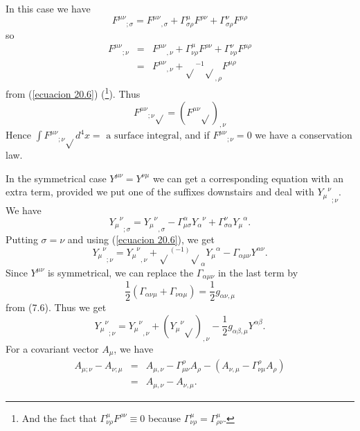 In this case we have
\[
 {F^{\mu\nu}}_{;\sigma} = {F^{\mu\nu}}_{,\sigma} +
 \Gamma^{\mu}_{\sigma\rho} F^{\rho\nu} +
 \Gamma^{\nu}_{\sigma\rho} F^{\mu\rho}
\]
so
\[
 \begin{array}{rcl}
  {F^{\mu\nu}}_{;\nu} & = & {F^{\mu\nu}}_{,\nu} +
 \Gamma^{\mu}_{\nu\rho} F^{\rho\nu} +
 \Gamma^{\nu}_{\nu\rho} F^{\mu\rho} \\
 & = & {F^{\mu\nu}}_{,\nu} + \sqrt{}^{-1} \sqrt{}_{,\rho} F^{\mu\rho}
 \end{array}
\]
from (\ref{ecuacion 20.6}) (\footnote{And the fact that $\Gamma^{\mu}_{\nu\rho} F^{\rho\nu} \equiv 0$ because 
$\Gamma^{\mu}_{\nu\rho} = \Gamma^{\mu}_{\rho\nu}$.}). Thus 
\begin{equation}
 \label{ecuacion 21.3}
 {F^{\mu\nu}}_{;\nu} \sqrt{} = \left( {F^{\mu\nu} \sqrt{}} \right)_{,\nu} 
\end{equation}
Hence $\int{{F^{\mu\nu}}_{;\nu} \sqrt{}d^4x} = \mbox{ a surface integral}$, and if ${F^{\mu\nu}}_{;\nu} = 0$ we have a 
conservation law.

In the symmetrical case $Y^{\mu\nu} = Y^{\nu\mu}$ we can get a corresponding equation with an extra term, provided we 
put one of the suffixes downstairs and deal with ${{Y_\mu}^\nu}_{;\nu}$. We have
\[
 {{Y_\mu}^\nu}_{;\sigma} = {{Y_\mu}^\nu}_{,\sigma} - \Gamma^\alpha_{\mu\sigma} {{Y_\alpha}^\nu} 
 + \Gamma^\nu_{\sigma\alpha} {{Y_\mu}^\alpha}.
\]
Putting $\sigma=\nu$ and using (\ref{ecuacion 20.6}), we get
\[
  {{Y_\mu}^\nu}_{;\nu} = {{Y_\mu}^\nu}_{,\nu} 
 + \sqrt{}^{(-1)}\sqrt{}_{\alpha} {{Y_\mu}^\alpha}
 - \Gamma_{\alpha\mu\nu} {Y^{\alpha\nu}}.
\]
Since $Y^{\mu\nu}$ is symmetrical, we can replace the $\Gamma_{\alpha\mu\nu}$ in the last term by
\[
\frac{1}{2}\left( \Gamma_{\alpha\nu\mu} + \Gamma_{\nu\alpha\mu} \right) = \frac{1}{2} g_{\alpha\nu,\mu}
\]
from (7.6). Thus we get
\begin{equation}
 \label{ecuacion 21.4}
 {{Y_\mu}^\nu}_{;\nu} = {{Y_\mu}^\nu}_{,\nu} 
 +  \left( {{Y_\mu}^\nu} \sqrt{} \right)_{,\nu}
 - \frac{1}{2} g_{\alpha\beta,\mu} Y^{\alpha\beta}.
\end{equation}
For a covariant vector $A_\mu$, we have
\begin{equation}
 \label{ecuacion 21.5}
 \begin{array}{rcl}
 A_{\mu;\nu} - A_{\nu;\mu} & = & A_{\mu,\nu} - \Gamma^\rho_{\mu\nu} A_{\rho} - 
 \left( A_{\nu,\mu} - \Gamma^\rho_{\nu\mu} A_{\rho} \right)\\
 & = & A_{\mu,\nu} - A_{\nu,\mu}.
 \end{array}
\end{equation}

